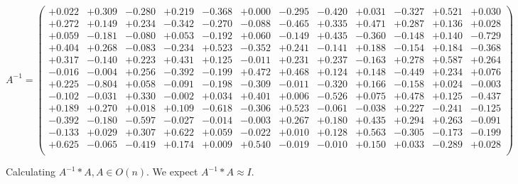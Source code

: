 \documentclass[9pt]{article}
\theoremstyle{plain}
\theoremstyle{definition}
\theoremstyle{remark}
\numberwithin{equation}{section}
\begin{document}
$A^{-1} = \left(
\begin{array}{
cccccccccccc}
+0.022 & +0.309 & -0.280 & +0.219 & -0.368 & +0.000 & -0.295 & -0.420 & +0.031 & -0.327 & +0.521 & +0.030 \\
+0.272 & +0.149 & +0.234 & -0.342 & -0.270 & -0.088 & -0.465 & +0.335 & +0.471 & +0.287 & +0.136 & +0.028 \\
+0.059 & -0.181 & -0.080 & +0.053 & -0.192 & +0.060 & -0.149 & +0.435 & -0.360 & -0.148 & +0.140 & -0.729 \\
+0.404 & +0.268 & -0.083 & -0.234 & +0.523 & -0.352 & +0.241 & -0.141 & +0.188 & -0.154 & +0.184 & -0.368 \\
+0.317 & -0.140 & +0.223 & +0.431 & +0.125 & -0.011 & +0.231 & +0.237 & -0.163 & +0.278 & +0.587 & +0.264 \\
-0.016 & -0.004 & +0.256 & -0.392 & -0.199 & +0.472 & +0.468 & +0.124 & +0.148 & -0.449 & +0.234 & +0.076 \\
+0.225 & -0.804 & +0.058 & -0.091 & -0.198 & -0.309 & -0.011 & -0.320 & +0.166 & -0.158 & +0.024 & -0.003 \\
-0.102 & -0.031 & +0.330 & -0.002 & +0.034 & +0.401 & +0.006 & -0.526 & +0.075 & +0.478 & +0.125 & -0.437 \\
+0.189 & +0.270 & +0.018 & +0.109 & -0.618 & -0.306 & +0.523 & -0.061 & -0.038 & +0.227 & -0.241 & -0.125 \\
-0.392 & -0.180 & -0.597 & -0.027 & -0.014 & -0.003 & +0.267 & +0.180 & +0.435 & +0.294 & +0.263 & -0.091 \\
-0.133 & +0.029 & +0.307 & +0.622 & +0.059 & -0.022 & +0.010 & +0.128 & +0.563 & -0.305 & -0.173 & -0.199 \\
+0.625 & -0.065 & -0.419 & +0.174 & +0.009 & +0.540 & -0.019 & -0.010 & +0.150 & +0.033 & -0.289 & +0.028 \\
\end{array}
\right)$ \newline 

Calculating $A^{-1} *A  ,  A \in O(n)$.   We expect $A^{-1} *A  \approx I$. 
\end{document}
